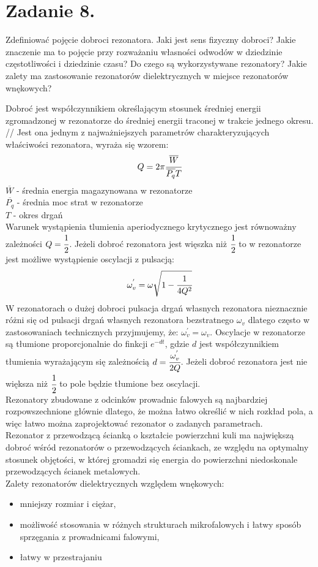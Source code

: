 \section*{Zadanie 8.}
\begin{task}
Zdefiniować pojęcie dobroci rezonatora. Jaki jest sens fizyczny dobroci? Jakie znaczenie ma to pojęcie przy rozważaniu własności odwodów w dziedzinie częstotliwości i dziedzinie czasu? Do czego są wykorzystywane rezonatory? Jakie zalety ma zastosowanie rezonatorów dielektrycznych w miejsce rezonatorów wnękowych?\\
\end{task}

\begin{solution}
Dobroć jest współczynnikiem określającym stosunek średniej energii zgromadzonej w rezonatorze do średniej energii traconej w trakcie jednego okresu. //
Jest ona jednym z najważniejszych parametrów charakteryzujących właściwości rezonatora, wyraża się wzorem:
$$Q=2\pi\cfrac{\overline{W}}{\overline{P_{q}}T}$$
$\overline{W}$ - średnia energia magazynowana w rezonatorze\\
$\overline{P_{q}}$ - średnia moc strat w rezonatorze\\
$T$ - okres drgań\\

Warunek wystąpienia tlumienia aperiodycznego krytycznego jest równoważny zależności $Q=\cfrac{1}{2}$. Jeżeli dobroć rezonatora jest więszka niż $\cfrac{1}{2}$ to w rezonatorze jest możliwe wystąpienie oscylacji z pulsacją:
$$\omega_{v}^{'}=\omega\sqrt{1-\cfrac{1}{4Q^{2}}}$$
W rezonatorach o dużej dobroci pulsacja drgań własnych rezonatora nieznacznie różni się od pulsacji drgań własnych rezonatora bezstratnego $\omega_{v}$ dlatego często w zastosowaniach technicznych przyjmujemy, że: $\omega_{v}^{'}=\omega_{v}$. Oscylacje w rezonatorze są tłumione proporcjonalnie do finkcji $e^{-dt}$, gdzie $d$ jest współczynnikiem tłumienia wyrażającym się zależnością $d=\cfrac{\omega_{v}^{'}}{2Q}$. Jeżeli dobroć rezonatora jest nie większa niż $\cfrac{1}{2}$ to pole będzie tłumione bez oscylacji.\\
Rezonatory zbudowane z odcinków prowadnic falowych są najbardziej rozpowszechnione głównie dlatego, że można łatwo określić w nich rozkład pola, a więc łatwo można zaprojektować rezonator o zadanych parametrach.\\
Rezonator z przewodzącą ścianką o kształcie powierzchni kuli ma największą dobroć wśród rezonatorów o przewodzących ściankach, ze względu na optymalny stosunek objętości, w której gromadzi się energia do powierzchni niedoskonale przewodzących ścianek metalowych.\\
Zalety rezonatorów dielektrycznych względem wnękowych:
\begin{itemize}
\item mniejszy rozmiar i ciężar,
\item możliwość stosowania w różnych strukturach mikrofalowych i łatwy sposób sprzęgania z prowadnicami falowymi,
\item łatwy w przestrajaniu
\end{itemize}




\end{solution}